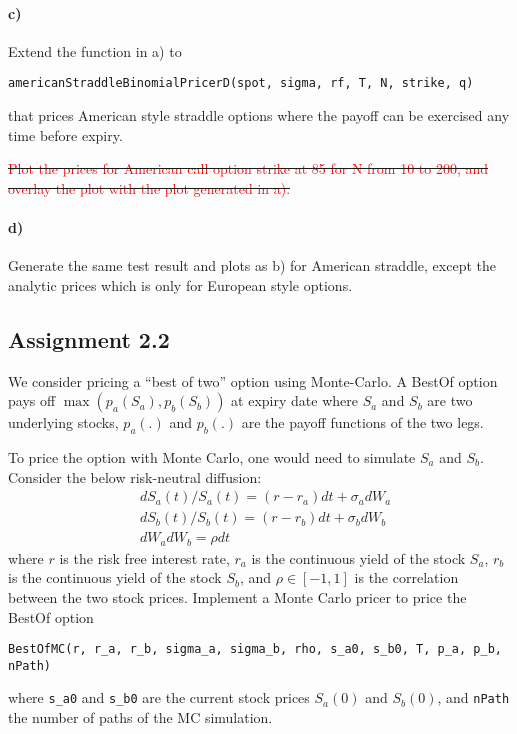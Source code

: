 \documentclass[11pt,a4paper,hidelinks,fleqn]{article}            %
\begin{document}
\paragraph{c)} Extend the function in a) to 
\vspace{-5mm}
\begin{verbatim}
americanStraddleBinomialPricerD(spot, sigma, rf, T, N, strike, q)
\end{verbatim}
\vspace{-5mm}
that prices American style straddle options where the payoff can be exercised any time before expiry. 

\sout{\textcolor{red}{Plot the prices for American call option strike at 85 for N from 10 to 200, and overlay the plot with the plot generated in a).}}

\paragraph{d)} Generate the same test result and plots as b) for American straddle, except the analytic prices which is only for European style options.

\subsection*{Assignment 2.2}
We consider pricing a ``best of two'' option using Monte-Carlo.
A BestOf option pays off $\max(p_a(S_a), p_b(S_b))$ at expiry date
where $S_a$ and $S_b$ are two underlying stocks, 
$p_a(.)$ and $p_b(.)$ are the payoff functions of the two legs.

To price the option with Monte Carlo, one would need to simulate $S_a$ and $S_b$.
Consider the below risk-neutral diffusion:
\begin{align}
& dS_a(t) / S_a(t) = (r-r_a) dt + \sigma_a dW_a \\
& dS_b(t) / S_b(t) = (r-r_b) dt + \sigma_b dW_b \\
& dW_a dW_b = \rho dt
\end{align}
where $r$ is the risk free interest rate, 
$r_a$ is the continuous yield of the stock $S_a$, 
$r_b$ is the continuous yield of the stock $S_b$, 
and $\rho \in [-1, 1]$ is the correlation between the two stock prices.
Implement a Monte Carlo pricer to price the BestOf option
\begin{verbatim}
BestOfMC(r, r_a, r_b, sigma_a, sigma_b, rho, s_a0, s_b0, T, p_a, p_b, nPath)
\end{verbatim}
where \verb=s_a0= and \verb=s_b0= are the current stock prices $S_a(0)$ and $S_b(0)$, and \verb=nPath= the number of paths of the MC simulation. 
\end{document}
